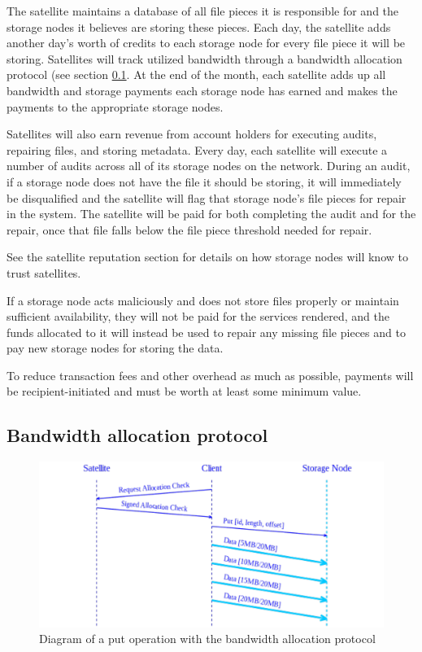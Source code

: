 \documentclass[11pt,fleqn,openany]{book}
\begin{document}
The satellite maintains a database of all file pieces it is responsible for
and the storage nodes it believes are storing these pieces. Each day,
the satellite adds another day's worth
of credits to each storage node for every file
piece
it will be storing.
Satellites will track utilized bandwidth through a bandwidth allocation
protocol (see section \ref{bap}.
At the end of the month, each satellite
adds up all bandwidth and storage payments each storage node has earned and
makes
the payments to the appropriate storage nodes.

Satellites will also earn revenue from account holders for executing audits,
repairing files, and storing metadata. Every day, each satellite will execute
a number of audits across all of its storage nodes on the network. During an
audit,
if a storage node does not have the file it should be storing, it will
immediately be disqualified and
the satellite will flag that storage node's file pieces for
repair
in the system.
The satellite will be paid for both completing the audit
and for the repair,
once that file falls below the file piece threshold needed for
repair.

See the satellite reputation section for details on
how storage nodes will know to trust satellites.

If a storage node acts
maliciously and does not store files properly or maintain sufficient
availability, they will not be paid for the services rendered, and the funds
allocated to it will instead be used to repair any missing
file pieces and to pay new storage nodes for storing the data.

To reduce transaction fees and other overhead as much as possible, payments
will be recipient-initiated and must be worth at least some minimum value.

\subsection{Bandwidth allocation protocol}\label{bap}

\begin{figure}
\centering
\includegraphics[width=\textwidth]{diagram-drafts/bandwidth-allocation/bandwidth-put.pdf}
\caption{Diagram of a put operation with the bandwidth allocation protocol}
\label{fig:bap-put}
\end{figure}
\end{document}
